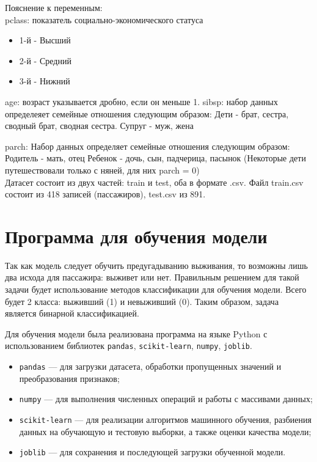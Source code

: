 \documentclass[14pt,a4paper]{extarticle}
\begin{document}
    Пояснение к переменным: \\
    \indent pclass: показатель социально-экономического статуса
    \begin{itemize}
        \setlength{\itemindent}{2em}
        \item 1-й - Высший
        \item 2-й - Средний
        \item 3-й - Нижний
    \end{itemize}

    age: возраст указывается дробно, если он меньше 1.
    sibsp: набор данных определеяет семейные отношения следующим образом:
        Дети - брат, сестра, сводный брат, сводная сестра.
        Супруг - муж, жена

    parch: Набор данных определяет семейные отношения следующим образом:
        Родитель - мать, отец
        Ребенок - дочь, сын, падчерица, пасынок (Некоторые дети путешествовали
        только с няней, для них parch = 0) \\

    Датасет состоит из двух частей: train и test, оба в формате .csv.
    Файл train.csv состоит из 418 записей (пассажиров), test.csv из 891.

\section{Программа для обучения модели}

Так как модель следует обучить предугадыванию выживания, то возможны лишь два
исхода для пассажира: выживет или нет. Правильным решением для такой задачи
будет использование методов классификации для обучения модели. Всего будет 2
класса: выживший (1) и невыживший (0). Таким образом, задача является бинарной классификацией.

Для обучения модели была реализована программа на языке Python с использованием
библиотек \texttt{pandas}, \texttt{scikit-learn}, \texttt{numpy}, \texttt{joblib}.

\begin{itemize}
    \item \texttt{pandas} — для загрузки датасета, обработки пропущенных значений и преобразования признаков;
    \item \texttt{numpy} — для выполнения численных операций и работы с массивами данных;
    \item \texttt{scikit-learn} — для реализации алгоритмов машинного обучения, разбиения данных на обучающую и тестовую выборки, а также оценки качества модели;
    \item \texttt{joblib} — для сохранения и последующей загрузки обученной модели.
\end{itemize}
\end{document}

